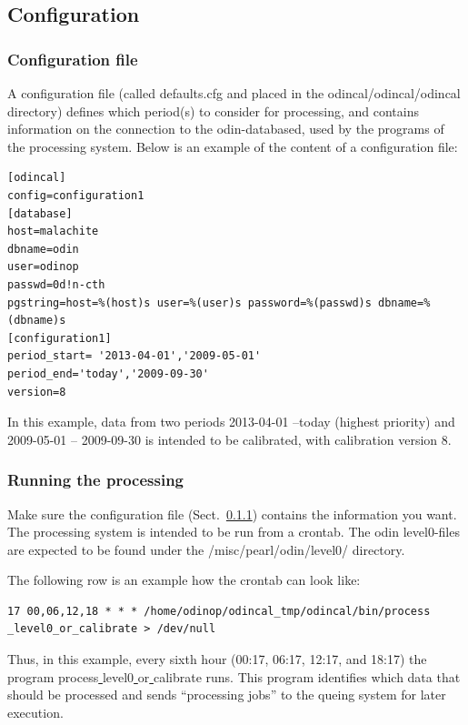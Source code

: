 \documentclass[12pt]{article}
\begin{document}
\subsection{Configuration}
\subsubsection{Configuration file}
\label{sec:config}
A configuration file (called defaults.cfg and placed
in the odincal/odincal/odincal directory) defines which period(s) to consider
for processing, and contains information on the connection
to the odin-databased, used by the programs of the processing system.
Below is an example of the content of a configuration file:
\begin{verbatim}
[odincal]
config=configuration1
[database]
host=malachite
dbname=odin
user=odinop
passwd=0d!n-cth
pgstring=host=%(host)s user=%(user)s password=%(passwd)s dbname=%(dbname)s
[configuration1]
period_start= '2013-04-01','2009-05-01'
period_end='today','2009-09-30'
version=8
\end{verbatim}
In this example, data from two periods 2013-04-01 --today (highest priority)
and 2009-05-01 -- 2009-09-30
is intended to be calibrated, with calibration version 8.

\subsubsection{Running the processing}
Make sure the configuration file (Sect.~\ref{sec:config}) contains
the information you want.  
The processing system is intended to be run from a crontab.
The odin level0-files are expected to be found
under the /misc/pearl/odin/level0/ directory.

The following row is an example how the crontab can look like: 
\begin{verbatim}
17 00,06,12,18 * * * /home/odinop/odincal_tmp/odincal/bin/process
_level0_or_calibrate > /dev/null
\end{verbatim}
Thus, in this example, every sixth hour (00:17, 06:17, 12:17, and 18:17)
the program process\underline{ }level0\underline{ }or\underline{ }calibrate
runs. This program identifies which data that should be processed
and sends ``processing jobs'' to the queing system for later execution.
\end{document}
